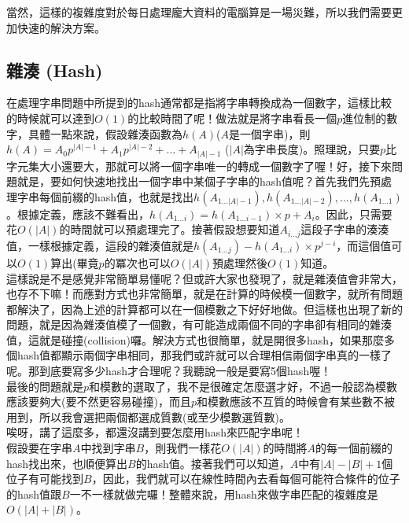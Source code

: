 當然，這樣的複雜度對於每日處理龐大資料的電腦算是一場災難，所以我們需要更加快速的解決方案。

\subsection{雜湊 (Hash)}
在處理字串問題中所提到的hash通常都是指將字串轉換成為一個數字，這樣比較的時候就可以達到$O(1)$的比較時間了呢！做法就是將字串看長一個$p$進位制的數字，具體一點來說，假設雜湊函數為$h(A)$($A$是一個字串)，則
\begin{math}
h(A) = A_0p^{|A|-1} + A_1p^{|A|-2} + ... + A_{|A|-1}
\end{math}
($|A|$為字串長度)。照理說，只要$p$比字元集大小還要大，那就可以將一個字串唯一的轉成一個數字了喔！好，接下來問題就是，要如何快速地找出一個字串中某個子字串的hash值呢？首先我們先預處理字串每個前綴的hash值，也就是找出$h(A_{1...|A|-1}), h(A_{1...|A|-2}),...,h(A_{1...1})$。根據定義，應該不難看出，$h(A_{1...i}) = h(A_{1...i-1})\times p + A_i$。因此，只需要花$O(|A|)$的時間就可以預處理完了。接著假設想要知道$A_{i...j}$這段子字串的湊湊值，一樣根據定義，這段的雜湊值就是$h(A_{1...j}) - h(A_{1...i})\times p^{j-i}$，而這個值可以$O(1)$算出(畢竟$p$的冪次也可以$O(|A|)$預處理然後$O(1)$知道。\\

這樣說是不是感覺非常簡單易懂呢？但或許大家也發現了，就是雜湊值會非常大，也存不下嘛！而應對方式也非常簡單，就是在計算的時候模一個數字，就所有問題都解決了，因為上述的計算都可以在一個模數之下好好地做。但這樣也出現了新的問題，就是因為雜湊值模了一個數，有可能造成兩個不同的字串卻有相同的雜湊值，這就是碰撞(collision)囉。解決方式也很簡單，就是開很多hash，如果那麼多個hash值都顯示兩個字串相同，那我們或許就可以合理相信兩個字串真的一樣了呢。那到底要寫多少hash才合理呢？我聽說一般是要寫5個hash喔！\\

最後的問題就是$p$和模數的選取了，我不是很確定怎麼選才好，不過一般認為模數應該要夠大(要不然更容易碰撞)，而且$p$和模數應該不互質的時候會有某些數不被用到，所以我會選把兩個都選成質數(或至少模數選質數)。\\

唉呀，講了這麼多，都還沒講到要怎麼用hash來匹配字串呢！\\

假設要在字串$A$中找到字串$B$，則我們一樣花$O(|A|)$的時間將$A$的每一個前綴的hash找出來，也順便算出$B$的hash值。接著我們可以知道，$A$中有$|A| - |B| + 1$個位子有可能找到$B$，因此，我們就可以在線性時間內去看每個可能符合條件的位子的hash值跟$B$一不一樣就做完囉！整體來說，用hash來做字串匹配的複雜度是$O(|A| + |B|)$。\\

